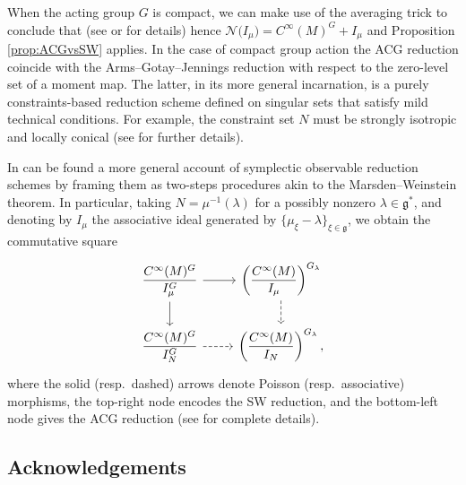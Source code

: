 \documentclass[pdftex]{sigma}
\numberwithin{equation}{section}
\newcommand{\g}{\mathfrak{g}}
\begin{document}
\begin{Remark}
 When the acting group $G$ is compact, we can make use of the averaging trick to conclude that  (see \cite[Proposition~5.12]{ArmsGotayJennings90} or \cite[Proposition~5]{Sniatycki05} for details) hence $\mathcal{N}\bigl(I_\mu\bigr)= C^\infty(M)^G + I_\mu$ and Proposition \ref{prop:ACGvsSW} applies.
 In the case of compact group action the ACG reduction coincide with the Arms--Gotay--Jennings reduction \cite[Theorem~6.1]{ArmsGotayJennings90}
 with respect to the zero-level set of a moment map.
 The latter, in its more general incarnation, is a purely constraints-based reduction scheme defined on singular sets that satisfy mild technical conditions. For example, the constraint set $N$ must be strongly isotropic and locally conical (see \cite[Section~3]{ArmsGotayJennings90} for further details).
\end{Remark}

\begin{Remark}
In \cite{Sniatycki05} can be found a more general account of symplectic observable reduction schemes by framing them as two-steps procedures akin to the Marsden--Weinstein theorem.
In particular, taking $N=\mu^{-1}(\lambda)$ for a possibly nonzero $\lambda \in \g^*$, and denoting by $I_\mu$ the associative ideal generated by $\{\mu_\xi - \lambda\}_{\xi \in \g}$, we obtain the commutative square
\begin{displaymath}
	\begin{tikzcd}
		\dfrac{C^\infty(M)^G}{I_\mu^G} \ar[r]\ar[d] &
		\left(\dfrac{C^\infty(M)}{I_\mu}\right)^{G_\lambda} \ar[d,dashed]
		\\
		\dfrac{C^\infty(M)^G}{I_N^G} \ar[dashed,r] &
		\left(\dfrac{C^\infty(M)}{I_N}\right)^{G_\lambda},
	\end{tikzcd}
\end{displaymath}
where the solid (resp.\ dashed) arrows denote Poisson (resp.\ associative) morphisms, the top-right node encodes the SW reduction, and the bottom-left node gives the ACG reduction (see \cite[Remarks~1 to~3 and equation~(11)]{Sniatycki05} for complete details).
\end{Remark}

\subsection*{Acknowledgements}
\end{document}
